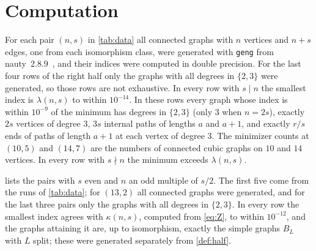 \documentclass[11pt]{article}
\theoremstyle{definition}
\theoremstyle{remark}
\begin{document}
\section{Computation}\label{sec:data}

For each pair $(n,s)$ in \cref{tab:data} all connected graphs with $n$ vertices and $n+s$ edges, one from each
isomorphism class, were generated with \texttt{geng} from nauty~2.8.9~\cite{MP14}, and their indices were computed in
double precision. For the last four rows of the right half only the graphs with all degrees in $\{2,3\}$ were generated, so those rows
are not exhaustive. In every row with $s\mid n$ the smallest index is $\lambda(n,s)$ to within
$10^{-14}$. In these rows every graph whose index is within $10^{-9}$ of the minimum has degrees in $\{2,3\}$ (only $3$
when $n=2s$), exactly $2s$ vertices of degree $3$, $3s$ internal paths of lengths $a$ and $a+1$, and exactly $r/s$ ends
of paths of length $a+1$ at each vertex of degree $3$. The minimizer counts at $(10,5)$ and
$(14,7)$ are the numbers of connected cubic graphs on $10$ and $14$ vertices. In every row with $s\nmid n$ the
minimum exceeds $\lambda(n,s)$.

 lists the pairs with $s$ even and $n$ an odd multiple of $s/2$. The first five come from the runs of
\cref{tab:data}; for $(13,2)$ all connected graphs were generated, and for the last three pairs only the graphs with all
degrees in $\{2,3\}$. In every row the smallest index agrees with $\kappa(n,s)$, computed from \eqref{eq:Z}, to within
$10^{-12}$, and the graphs attaining it are, up to isomorphism, exactly the simple graphs $B_L$ with $L$ split; these
were generated separately from \cref{def:half}.
\end{document}

